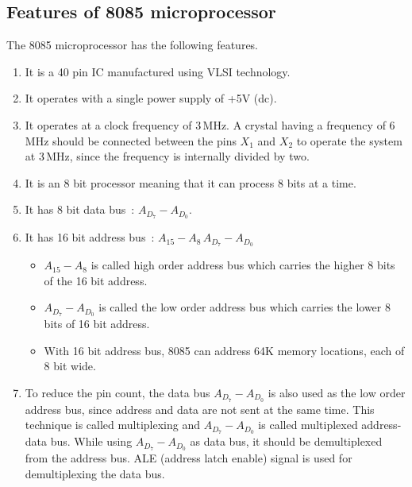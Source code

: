 \subsection{Features of 8085 microprocessor}\label{sec7.8.1}

The 8085 microprocessor has the following features.
\begin{enumerate}
\renewcommand{\labelenumi}{$\bullet$}
\itemsep=7pt
\item It is a 40 pin IC manufactured using VLSI technology.

\item It operates with a single power supply of +5V (dc).

\item It operates at a clock frequency of 3\,MHz. A crystal having a frequency of 6\,MHz should be connected between the pins $X_{1}$ and $X_{2}$ to operate the system at 3\,MHz, since the frequency is internally divided by two.

\item It is an 8 bit processor meaning that it can process 8 bits at a time.

\item It has 8 bit data bus~: $A_{D_{7}}-A_{D_{0}}$.

\item It has 16 bit address bus~: $A_{15}-A_{8}\,A_{D_{7}}-A_{D_{0}}$
\begin{itemize}
\item $A_{15}-A_{8}$ is called high order address bus which carries the higher 8 bits of the 16 bit address.

\item $A_{D_{7}}-A_{D_{0}}$ is called the low order address bus which carries the lower 8 bits of 16 bit address.

\item With 16 bit address bus, 8085 can address 64K memory locations, each of 8 bit wide.
\end{itemize}

\item To reduce the pin count, the data bus $A_{D_{7}}-A_{D_{0}}$ is also used as the low order address bus, since address and data are not sent at the same time. This technique is called multiplexing and $A_{D_{7}}-A_{D_{0}}$ is called multiplexed address-data bus. While using $A_{D_{7}}-A_{D_{0}}$ as data bus, it should be demultiplexed from the address bus. ALE (address latch enable) signal is used for demultiplexing the data bus.


\end{enumerate}
